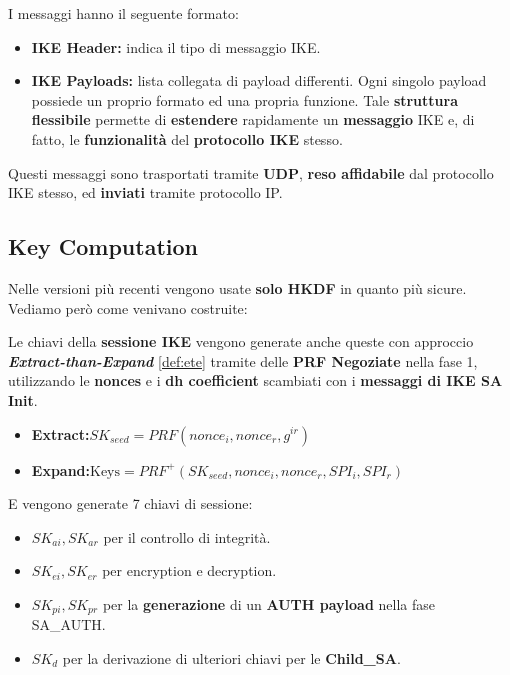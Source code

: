 \pagebreak
I messaggi hanno il seguente formato:
\begin{definition}\label{def:ikemsg}
\begin{itemize}
    \item \textbf{IKE Header:} indica il tipo di messaggio IKE.
    \item \textbf{IKE Payloads:} lista collegata di payload differenti. Ogni singolo payload possiede un proprio formato ed una propria funzione. Tale \textbf{struttura flessibile} permette di \textbf{estendere} rapidamente un \textbf{messaggio} IKE e, di fatto, le \textbf{funzionalità} del \textbf{protocollo IKE} stesso.
\end{itemize}
\begin{remark}
Questi messaggi sono trasportati tramite \textbf{UDP}, \textbf{reso affidabile} dal protocollo IKE stesso, ed \textbf{inviati} tramite protocollo IP.
\end{remark}
\end{definition}
\subsection{Key Computation}
\begin{note}
Nelle versioni più recenti vengono usate \textbf{solo HKDF} in quanto più sicure. Vediamo però come venivano costruite:
\end{note}
Le chiavi della \textbf{sessione IKE} vengono generate anche queste con approccio \textit{\textbf{Extract-than-Expand}} \cref{def:ete} tramite delle \textbf{PRF Negoziate} nella fase 1, utilizzando le \textbf{nonces} e i \textbf{dh coefficient} scambiati con i \textbf{messaggi di IKE SA Init}. 
\begin{definition}
\begin{itemize}
    \item \textbf{Extract:}$SK_{seed}=PRF(nonce_i,nonce_r,g^{ir})$\footnotemark
    \item \textbf{Expand:}$\text{Keys}=PRF^+(SK_{seed},nonce_i,nonce_r,SPI_i,SPI_r)$
\end{itemize}
E vengono generate 7 chiavi di sessione:
\begin{itemize}
    \item $SK_{ai},SK_{ar}$ per il controllo di integrità.
    \item $SK_{ei},SK_{er}$ per encryption e decryption.
    \item $SK_{pi},SK_{pr}$ per la \textbf{generazione} di un \textbf{AUTH payload} nella fase SA\_AUTH.
    \item $SK_{d}$ per la derivazione di ulteriori chiavi per le \textbf{Child\_SA}.
\end{itemize}
\end{definition}
